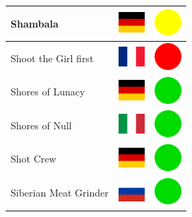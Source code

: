 \documentclass[12pt, a4paper, twoside]{report}
\begin{document}
\begin{center}
\begin{longtable}{|p{5cm}|p{2cm}|p{2cm}|}
Shambala & \includegraphics[width=1cm]{4x3/de} & \includegraphics[width=1cm]{likes/m} \\ \hline
Shoot the Girl first & \includegraphics[width=1cm]{4x3/fr} & \includegraphics[width=1cm]{likes/n} \\ \hline
Shores of Lunacy & \includegraphics[width=1cm]{4x3/de} & \includegraphics[width=1cm]{likes/y} \\ \hline
Shores of Null & \includegraphics[width=1cm]{4x3/it} & \includegraphics[width=1cm]{likes/y} \\ \hline
Shot Crew & \includegraphics[width=1cm]{4x3/de} & \includegraphics[width=1cm]{likes/y} \\ \hline
Siberian Meat Grinder & \includegraphics[width=1cm]{4x3/ru} & \includegraphics[width=1cm]{likes/y} \\ \hline

\end{longtable}
\end{center}
\end{document}
